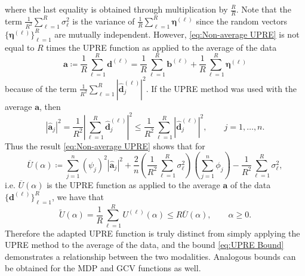 \documentclass[12pt]{article}
\newcommand{\aVec}{\mathbf{a}}	%
\newcommand{\bVec}{\mathbf{b}}	%
\newcommand{\dVec}{\mathbf{d}}	%
\newcommand{\dft}[1]{\widehat{#1}}	%
\newcommand{\regparam}{\alpha}
\newcommand{\filt}{\phi}
\newcommand{\mfilt}{\psi}
\newcommand{\noise}{\eta}	%
\newcommand{\noiseSD}{\sigma}	%
\newcommand{\noiseVec}{\bm{\noise}}	%
\newcommand{\U}{U}	%
\begin{document}
where the last equality is obtained through multiplication by $\frac{R}{R}$. Note that the term $\frac{1}{R^2} \sum_{\ell=1}^R\noiseSD_\ell^2$ is the variance of $\frac{1}{R} \sum_{\ell=1}^R \noiseVec^{(\ell)}$ since the random vectors $\{\noiseVec^{(\ell)}\}_{\ell=1}^R$ are mutually independent. However, \eqref{eq:Non-average UPRE} is not equal to $R$ times the UPRE function as applied to the average of the data
\[\aVec \coloneqq \frac{1}{R}\sum_{\ell=1}^R \dVec^{(\ell)} = \frac{1}{R} \sum_{\ell=1}^R \bVec^{(\ell)} + \frac{1}{R} \sum_{\ell=1}^R \noiseVec^{(\ell)}\] 
because of the term $\frac{1}{R^2} \sum_{\ell=1}^R |\dft{\dVec}_j^{(\ell)}|^2$. If the UPRE method was used with the average $\aVec$, then
\begin{equation}
\label{eq:Coefficients of Average}
|\dft{\aVec}_j|^2 = \frac{1}{R^2}\left|\sum_{\ell=1}^R \dft{\dVec}_j^{(\ell)}\right|^2 \leq \frac{1}{R^2} \sum_{\ell=1}^R |\dft{\dVec}_j^{(\ell)}|^2, \qquad j = 1,\ldots,n.
\end{equation}
Thus the result \eqref{eq:Non-average UPRE} shows that for
\begin{equation}
\label{eq:UPRE of Average}
\overline{U}(\regparam) \coloneqq \sum_{j=1}^{n} \left(\mfilt_j\right)^2|\dft{\aVec}_j|^2 + \frac{2}{n} \left(\frac{1}{R^2} \sum_{\ell=1}^R \noiseSD_\ell^2\right) \left(\sum_{j=1}^{n} \filt_j\right) - \frac{1}{R^2} \sum_{\ell=1}^R\noiseSD_\ell^2,
\end{equation}
i.e. $\overline{U}(\regparam)$ is the UPRE function as applied to the average $\aVec$ of the data $\{\dVec^{(\ell)}\}_{\ell=1}^R$, we have that
\begin{equation}
\label{eq:UPRE Bound}
\widetilde{U}(\regparam) = \frac{1}{R} \sum_{\ell=1}^R \U^{(\ell)}(\regparam) \leq R \overline{U}(\regparam), \qquad \regparam \geq 0.
\end{equation}
Therefore the adapted UPRE function is truly distinct from simply applying the UPRE method to the average of the data, and the bound \eqref{eq:UPRE Bound} demonstrates a relationship between the two modalities. Analogous bounds can be obtained for the MDP and GCV functions as well.

\end{document}
